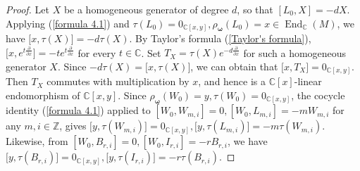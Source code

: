 \documentclass[12pt,reqno]{amsart}
\def\Z{\mathbb{Z}}
\def\C{\mathbb{C}}
\numberwithin{equation}{section}
\begin{document}
\begin{proof}
    Let $X$ be a homogeneous generator of degree $d$, so that $[L_{0},X]=-dX$.
 Applying (\ref{formula 4.1}) and $\tau(L_0)=0_{\C[x,y]},\rho_{\boldsymbol{\omega}}(L_0)=x\in\operatorname{End}_{\C}(M)$, we have $\big[x,\tau(X)   \big]=-d\tau(X)$.
By Taylor's formula (\ref{Taylor's formula}),   $\big[x,e^{t\frac{\partial}{\partial{x}}}\big]=-te^{t\frac{\partial}{\partial{x}}}$ for every $t\in\C$. Set $T_X=\tau(X)e^{-d\frac{\partial}{\partial{x}}}$ for such a homogeneous generator $X$. Since $-d\tau(X)=\big[x,\tau(X)   \big]$, we can obtain that $\big[x,T_X   \big]=0_{\C[x,y]}.$
Then $T_X$ commutes with multiplication by $x$, and hence is a $\C[x]$-linear endomorphism of $\C[x,y]$. 
Since $\rho_{\boldsymbol{\omega}}(W_0)=y,\tau(W_0)=0_{\C[x,y]}$, the cocycle identity (\ref{formula 4.1}) applied to $[W_0,W_{m,i}]=0,[W_0,L_{m,i}]=-mW_{m,i}$ for any $m,i\in\Z$, gives $\big[y,\tau(W_{m,i})  \big]=0_{\C[x,y]},\big[y,\tau(L_{m,i})  \big]=-m\tau(W_{m,i})$. Likewise, from $[W_{0}, B_{r,i}]=0,[W_{0},I_{r,i}]=-rB_{r,i}$, we have $\big[y,\tau(B_{r,i})  \big]=0_{\C[x,y]},\big[y,\tau(I_{r,i})  \big]=-r\tau(B_{r,i})$.


\end{proof}
\end{document}
